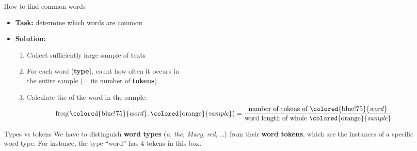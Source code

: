 \documentclass[professionalfonts, xcolor={usenames,svgnames,x11names,table}]{beamer}
\begin{document}
\begin{frame}{How to find common words}
    \begin{itemize}
        \item \textbf{Task:} determine which words are common
        \item \textbf{Solution:}
            \begin{enumerate}
                \item Collect sufficiently large sample of texts
                \item For each word (\textbf{type}), count how often it occurs in\\
                    the entire sample (= its number of \textbf{tokens}).
                \item Calculate the  of the word in the sample:
                    \[
                        \text{freq}(
                            \text{\colored{blue!75}{\emph{word}}},
                            \text{\colored{orange}{\emph{sample}}}
                            )
                        =
                        \frac{%
                            \text{number of tokens of \colored{blue!75}{\emph{word}}}}
                            {\text{word length of whole \colored{orange}{\emph{sample}}}}
                    \]
            \end{enumerate}
    \end{itemize}

    \pause
    \begin{block}{Types vs tokens}
        We have to distinguish \textbf{\alert<3>{word} types}
        (\emph{a}, \emph{the}, \emph{Mary}, \emph{red}, \ldots)
        from their \textbf{\alert<3>{word} tokens}, which are the instances of a specific \alert<3>{word} type.
        For instance, the type ``\alert<3>{word}'' has \alert<3>{4 tokens} in this box.
    \end{block}
\end{frame}
\end{document}
